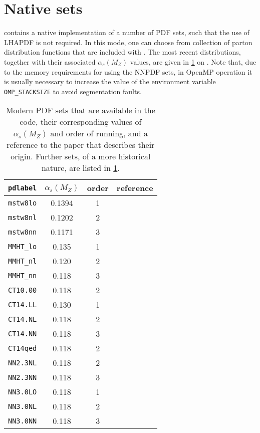 \section{Native \PDF{} sets}
\label{olderPDFs}

\MCFM{} contains a native implementation of a number of PDF sets, such that
the use of LHAPDF is not required.  In this mode, one can choose from 
collection of parton distribution functions that are included with
\MCFM{}.  The most recent distributions, together with their associated $\alpha_s(M_Z)$
values, are given in \cref{pdlabelrecent} on .
Note that,  due to the memory requirements for
using the NNPDF sets, in OpenMP operation it is usually necessary to increase
the value of the environment variable {\tt OMP\_STACKSIZE} to avoid
segmentation faults.
%
\begin{table}[h]
\begin{center}
\begin{tabular}{|c|c|c|c|}
\hline
{\tt pdlabel}  & $\alpha_s(M_Z)$ & order & reference \\
\hline
{\tt mstw8lo}  & 0.1394 & 1     & \cite{Martin:2009iq} \\
{\tt mstw8nl}  & 0.1202 & 2     & \cite{Martin:2009iq} \\
{\tt mstw8nn}  & 0.1171 & 3     & \cite{Martin:2009iq} \\
{\tt MMHT\_lo}  & 0.135  & 1     & \cite{Harland-Lang:2014zoa} \\
{\tt MMHT\_nl}  & 0.120  & 2     & \cite{Harland-Lang:2014zoa} \\
{\tt MMHT\_nn}  & 0.118  & 3     & \cite{Harland-Lang:2014zoa} \\
\hline
{\tt CT10.00}  & 0.118  & 2     & \cite{Lai:2010vv} \\
{\tt CT14.LL}  & 0.130  & 1     & \cite{Dulat:2015mca} \\
{\tt CT14.NL}  & 0.118  & 2     & \cite{Dulat:2015mca} \\
{\tt CT14.NN}  & 0.118  & 3     & \cite{Dulat:2015mca} \\
{\tt CT14qed}  & 0.118  & 2     & \cite{Schmidt:2015zda} \\
\hline
{\tt NN2.3NL}  & 0.118  & 2     & \cite{Ball:2012cx} \\
{\tt NN2.3NN}  & 0.118  & 3     & \cite{Ball:2012cx} \\
{\tt NN3.0LO}  & 0.118  & 1     & \cite{Ball:2014uwa} \\
{\tt NN3.0NL}  & 0.118  & 2     & \cite{Ball:2014uwa} \\
{\tt NN3.0NN}  & 0.118  & 3     & \cite{Ball:2014uwa} \\
\hline
\end{tabular}
\end{center}
\caption{Modern PDF sets that are available in the code,
their corresponding values of $\alpha_s(M_Z)$ and order of running,
and a reference to the paper
that describes their origin.  Further sets, of a more historical nature, are listed in \cref{olderPDFs}.
\label{pdlabelrecent}}
\end{table}

